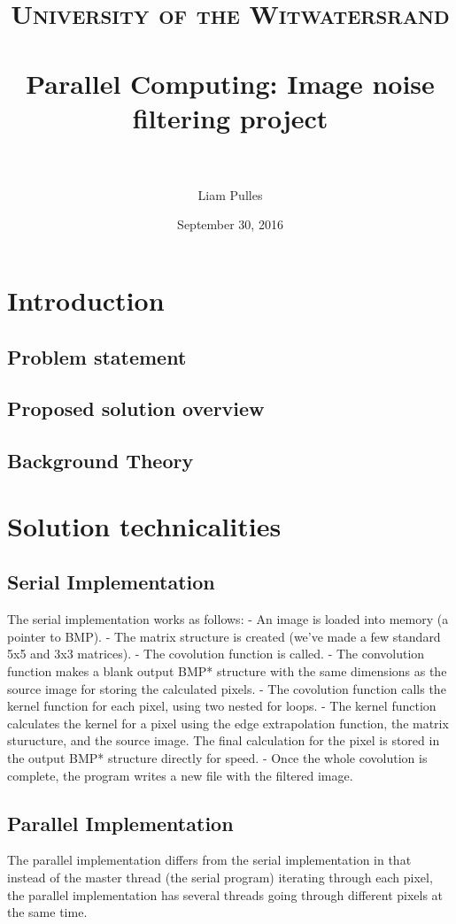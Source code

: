 \documentclass[paper=a4, fontsize=11pt]{scrartcl} %
\title{	
\normalfont \normalsize 
\textsc{University of the Witwatersrand} \\ [25pt] %
\horrule{0.5pt} \\[0.4cm] %
\huge Parallel Computing: Image noise filtering project \\ %
\horrule{2pt} \\[0.5cm] %
}
\author{Liam Pulles} %
\date{\normalsize September 30, 2016} %
\numberwithin{equation}{section} %
\numberwithin{figure}{section} %
\numberwithin{table}{section} %
\begin{document}
\maketitle %

\section{Introduction}
\subsection{Problem statement}
\subsection{Proposed solution overview}
\subsection{Background Theory}

\section{Solution technicalities}
\subsection{Serial Implementation}
The serial implementation works as follows:
 - An image is loaded into memory (a pointer to BMP).
 - The matrix structure is created (we've made a few standard 5x5 and 3x3 matrices).
 - The covolution function is called.
 - The convolution function makes a blank output BMP* structure with the same dimensions as the source image for storing the calculated pixels. 
 - The covolution function calls the kernel function for each pixel, using two nested for loops.
 - The kernel function calculates the kernel for a pixel using the edge extrapolation function, the matrix sturucture, and the source image. The final calculation for the pixel is stored in the output BMP* structure directly for speed.
 - Once the whole covolution is complete, the program writes a new file with the filtered image.
 
\subsection{Parallel Implementation}
The parallel implementation differs from the serial implementation in that instead of the master thread (the serial program) iterating through each pixel, the parallel implementation has several threads going through different pixels at the same time.
\end{document}
